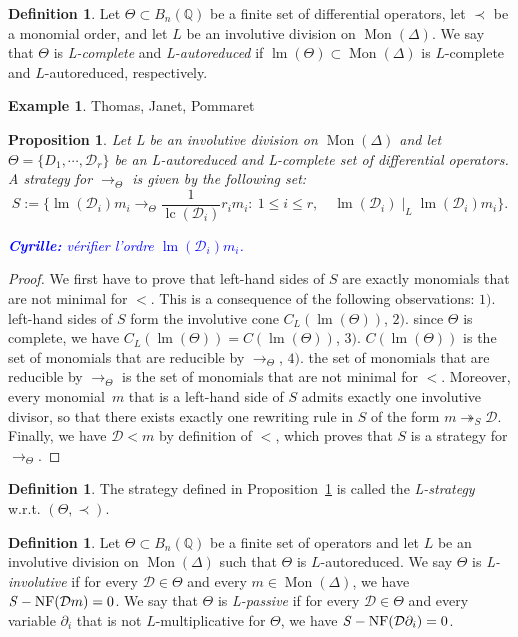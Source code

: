\documentclass[10pt]{easychair}
\newtheorem{proposition}[theorem]{Proposition}
\theoremstyle{definition}
\newtheorem{definition}[theorem]{Definition}
\newtheorem{example}[theorem]{Example}
\newcommand\fixmecc[1]{{\textcolor{blue}{{\bf Cyrille:} #1}}}
\newcommand\D{\mathcal{D}}
\DeclareMathOperator{\lm}{lm}
\DeclareMathOperator{\lc}{lc}
\newcommand\Q{\mathbb{Q}}
\newcommand\Weyl[1]{B_{#1}(\Q)}
\DeclareMathOperator{\Mon}{Mon}
\newcommand\rewS{\twoheadrightarrow_S}
\newcommand\rewTheta{\to_{\Theta}}
\newcommand\divInv[1]{\mid_{#1}}
\DeclareMathOperator{\SNF}{{\it S}-NF}
\begin{document}
\begin{definition}
  Let $\Theta\subset\Weyl{n}$ be a finite set of differential operators,
  let $\prec$ be a monomial order, and let $L$ be an involutive division
  on $\Mon(\Delta)$. We say that $\Theta$ is {\em L-complete} and
  {\em L-autoreduced} if $\lm(\Theta)\subset\Mon(\Delta)$ is $L$-complete
  and $L$-autoreduced, respectively.
\end{definition}

\begin{example}
  Thomas, Janet, Pommaret
\end{example}

\begin{proposition}\label{prop:involutive_strategy}
  Let L be an involutive division on $\Mon(\Delta)$ and let
  $\Theta=\{D_1,\cdots,\D_r\}$ be an L-autoreduced and L-complete set of
  differential operators. A strategy for $\rewTheta$ is given by the
  following set:
  \[S:=\{\lm(\D_i)m_i\rewTheta\frac{1}{\lc(\D_i)}r_im_i:\ 1\leq i\leq r,
  \quad\lm(\D_i)\divInv{L}\lm(\D_i)m_i\}.\]
    
  \fixmecc{vérifier l'ordre $\lm(\D_i)m_i$.}
\end{proposition}

\begin{proof}
  We first have to prove that left-hand sides of $S$ are exactly
  monomials that are not minimal for $<$. This is a consequence of the
  following observations: $1).$ left-hand sides of $S$ form the
  involutive cone $C_L(\lm(\Theta))$, $2).$ since $\Theta$ is complete,
  we have $C_L(\lm(\Theta))=C(\lm(\Theta))$, $3).$ $C(\lm(\Theta))$ is
  the set of monomials that are reducible by $\rewTheta$, $4).$ the set
  of monomials that are reducible by $\rewTheta$ is the set of monomials
  that are not minimal for $<$. Moreover, every monomial~$m$ that is a
  left-hand side of $S$ admits exactly one involutive divisor, so that
  there exists exactly one rewriting rule in $S$ of the form $m\rewS\D$.
  Finally, we have $\D<m$ by definition of $<$, which proves that $S$ is
  a strategy for $\rewTheta$.
\end{proof}

\begin{definition}
  The strategy defined in Proposition~\ref{prop:involutive_strategy} is
  called the {\em L-strategy} w.r.t. $(\Theta,\prec)$.
\end{definition}

\begin{definition}
  Let $\Theta\subset\Weyl{n}$ be a finite set of operators and let $L$ be
  an involutive division on $\Mon(\Delta)$ such that $\Theta$ is
  $L$-autoreduced. We say $\Theta$ is {\em L-involutive} if for every
  $\D\in\Theta$ and every $m\in\Mon(\Delta)$, we have $\SNF(\D m)=0$. We
  say that $\Theta$ is {\em  L-passive} if for every $\D\in\Theta$ and
  every variable $\partial_i$ that is not $L$-multiplicative for
  $\Theta$, we have $\SNF(\D\partial_i)=0$.
\end{definition}
\end{document}
